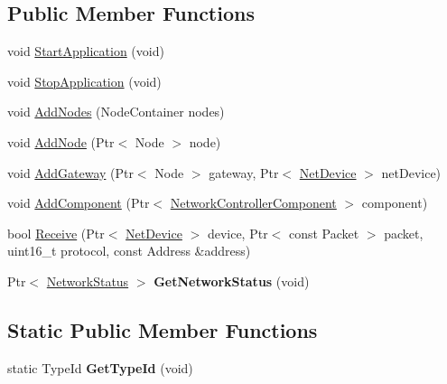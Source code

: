 \subsection*{Public Member Functions}
\begin{DoxyCompactItemize}
\item 
void \hyperlink{classns3_1_1lorawan_1_1NetworkServer_a49f56a2a0906c49cce6530cd4a734b1e}{Start\+Application} (void)
\item 
void \hyperlink{classns3_1_1lorawan_1_1NetworkServer_ad6a5b6bae3c4d290e1e7001841a1fe42}{Stop\+Application} (void)
\item 
void \hyperlink{classns3_1_1lorawan_1_1NetworkServer_ac2be7db7fbcd5acdbaeb3f8127164e2f}{Add\+Nodes} (Node\+Container nodes)
\item 
void \hyperlink{classns3_1_1lorawan_1_1NetworkServer_a3e39ba499b1ae2e66efac0d278fe0c0c}{Add\+Node} (Ptr$<$ Node $>$ node)
\item 
void \hyperlink{classns3_1_1lorawan_1_1NetworkServer_a7966b179bdd39dec7ed22a77442ce418}{Add\+Gateway} (Ptr$<$ Node $>$ gateway, Ptr$<$ \hyperlink{classNetDevice}{Net\+Device} $>$ net\+Device)
\item 
void \hyperlink{classns3_1_1lorawan_1_1NetworkServer_ae06877dca7b1a469dd178423bf9f17e5}{Add\+Component} (Ptr$<$ \hyperlink{classns3_1_1lorawan_1_1NetworkControllerComponent}{Network\+Controller\+Component} $>$ component)
\item 
bool \hyperlink{classns3_1_1lorawan_1_1NetworkServer_ab7b09f2cbc07147690dbea2da7b2b357}{Receive} (Ptr$<$ \hyperlink{classNetDevice}{Net\+Device} $>$ device, Ptr$<$ const Packet $>$ packet, uint16\+\_\+t protocol, const Address \&address)
\item 
\mbox{\label{classns3_1_1lorawan_1_1NetworkServer_a0664916eb128bf90f865a1e1079f9aa9}} 
Ptr$<$ \hyperlink{classns3_1_1lorawan_1_1NetworkStatus}{Network\+Status} $>$ {\bfseries Get\+Network\+Status} (void)
\end{DoxyCompactItemize}
\subsection*{Static Public Member Functions}
\begin{DoxyCompactItemize}
\item 
\mbox{\label{classns3_1_1lorawan_1_1NetworkServer_a684c1599dde67f1e1a48d06c109c1900}} 
static Type\+Id {\bfseries Get\+Type\+Id} (void)
\end{DoxyCompactItemize}
